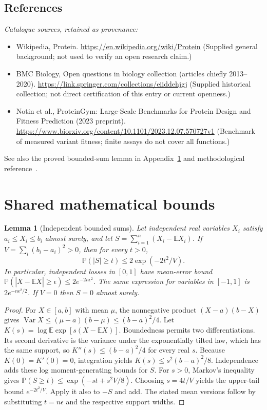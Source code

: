 \documentclass[11pt]{article}
\newcommand{\E}{\mathbb E}
\newcommand{\Prob}{\mathbb P}
\DeclareMathOperator{\Var}{Var}
\providecommand{\E}{\mathbb E}
\providecommand{\Prob}{\mathbb P}
\providecommand{\Var}{\operatorname{Var}}
\newtheorem{sharedlemma}{Lemma}[section]
\begin{document}
\subsection{References}
\noindent\emph{Catalogue sources, retained as provenance:}
\begin{itemize}
\item Wikipedia, Protein. \url{https://en.wikipedia.org/wiki/Protein} (Supplied general background; not used to verify an open research claim.)
\item BMC Biology, Open questions in biology collection (articles chiefly 2013--2020). \url{https://link.springer.com/collections/eiiddehjgj} (Supplied historical collection; not direct certification of this entry or current openness.)
\item Notin et al., ProteinGym: Large-Scale Benchmarks for Protein Design and Fitness Prediction (2023 preprint). \url{https://www.biorxiv.org/content/10.1101/2023.12.07.570727v1} (Benchmark of measured variant fitness; finite assays do not cover all functions.)
\end{itemize}
\noindent See also the proved bounded-sum lemma in Appendix~\ref{app:bounds} and methodological reference~\cite{hoeffding}.
\clearpage


\appendix
\section{Shared mathematical bounds}\label{app:bounds}
\begin{sharedlemma}[Independent bounded sums]\label{lem:bounded}
Let independent real variables $X_i$ satisfy $a_i\leq X_i\leq b_i$ almost surely,
and let $S=\sum_{i=1}^n(X_i-\E X_i)$. If
$V=\sum_i(b_i-a_i)^2>0$, then for every $t>0$,
\[
 \Prob(|S|\geq t)\leq 2\exp(-2t^2/V).
\]
In particular, independent losses in $[0,1]$ have mean-error bound
$\Prob(|\overline X-\E\overline X|\geq\epsilon)
\leq2e^{-2n\epsilon^2}$. The same expression for variables in $[-1,1]$
is $2e^{-n\epsilon^2/2}$. If $V=0$ then $S=0$ almost surely.
\end{sharedlemma}
\begin{proof}
For $X\in[a,b]$ with mean $\mu$, the nonnegative product
$(X-a)(b-X)$ gives
$\Var X\leq(\mu-a)(b-\mu)\leq(b-a)^2/4$.
Let $K(s)=\log\E\exp[s(X-\E X)]$.
Boundedness permits two differentiations. Its second derivative is the variance
under the exponentially tilted law, which has the same support, so
$K''(s)\leq(b-a)^2/4$ for every real $s$.
Because $K(0)=K'(0)=0$, integration yields
$K(s)\leq s^2(b-a)^2/8$.
Independence adds these log moment-generating bounds for $S$.
For $s>0$, Markov's inequality gives
$\Prob(S\geq t)\leq\exp(-st+s^2V/8)$.
Choosing $s=4t/V$ yields the upper-tail bound $e^{-2t^2/V}$.
Apply it also to $-S$ and add. The stated mean versions follow by substituting
$t=n\epsilon$ and the respective support widths.
\end{proof}
\end{document}
